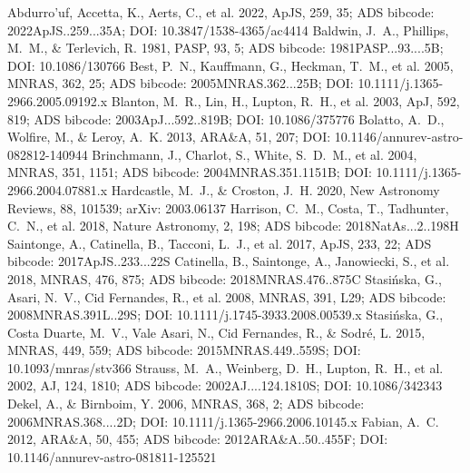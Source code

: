 \documentclass[twocolumn]{aastex631}
\begin{document}

\begin{thebibliography}{}
 Abdurro'uf, Accetta, K., Aerts, C., et al. 2022, ApJS, 259, 35; ADS bibcode: 2022ApJS..259...35A; DOI: 10.3847/1538-4365/ac4414
 Baldwin, J.~A., Phillips, M.~M., \& Terlevich, R. 1981, PASP, 93, 5; ADS bibcode: 1981PASP...93....5B; DOI: 10.1086/130766
 Best, P.~N., Kauffmann, G., Heckman, T.~M., et al. 2005, MNRAS, 362, 25; ADS bibcode: 2005MNRAS.362...25B; DOI: 10.1111/j.1365-2966.2005.09192.x
 Blanton, M.~R., Lin, H., Lupton, R.~H., et al. 2003, ApJ, 592, 819; ADS bibcode: 2003ApJ...592..819B; DOI: 10.1086/375776
 Bolatto, A.~D., Wolfire, M., \& Leroy, A.~K. 2013, ARA\&A, 51, 207; DOI: 10.1146/annurev-astro-082812-140944
 Brinchmann, J., Charlot, S., White, S.~D.~M., et al. 2004, MNRAS, 351, 1151; ADS bibcode: 2004MNRAS.351.1151B; DOI: 10.1111/j.1365-2966.2004.07881.x
 Hardcastle, M.~J., \& Croston, J.~H. 2020, New Astronomy Reviews, 88, 101539; arXiv: 2003.06137
 Harrison, C.~M., Costa, T., Tadhunter, C.~N., et al. 2018, Nature Astronomy, 2, 198; ADS bibcode: 2018NatAs...2..198H
 Saintonge, A., Catinella, B., Tacconi, L.~J., et al. 2017, ApJS, 233, 22; ADS bibcode: 2017ApJS..233...22S
 Catinella, B., Saintonge, A., Janowiecki, S., et al. 2018, MNRAS, 476, 875; ADS bibcode: 2018MNRAS.476..875C
 Stasi{\'n}ska, G., Asari, N.~V., Cid Fernandes, R., et al. 2008, MNRAS, 391, L29; ADS bibcode: 2008MNRAS.391L..29S; DOI: 10.1111/j.1745-3933.2008.00539.x
 Stasi{\'n}ska, G., Costa Duarte, M.~V., Vale Asari, N., Cid Fernandes, R., \& Sodr{\'e}, L. 2015, MNRAS, 449, 559; ADS bibcode: 2015MNRAS.449..559S; DOI: 10.1093/mnras/stv366
 Strauss, M.~A., Weinberg, D.~H., Lupton, R.~H., et al. 2002, AJ, 124, 1810; ADS bibcode: 2002AJ....124.1810S; DOI: 10.1086/342343
 Dekel, A., \& Birnboim, Y. 2006, MNRAS, 368, 2; ADS bibcode: 2006MNRAS.368....2D; DOI: 10.1111/j.1365-2966.2006.10145.x
 Fabian, A.~C. 2012, ARA\&A, 50, 455; ADS bibcode: 2012ARA&A..50..455F; DOI: 10.1146/annurev-astro-081811-125521

\end{thebibliography}
\end{document}
